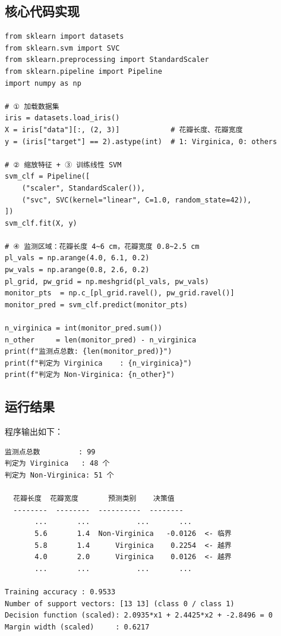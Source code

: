 \documentclass[10.5pt]{config}
\begin{document}
\subsection{核心代码实现}
\begin{listing}[H]
\begin{verbatim}
from sklearn import datasets
from sklearn.svm import SVC
from sklearn.preprocessing import StandardScaler
from sklearn.pipeline import Pipeline
import numpy as np

# ① 加载数据集
iris = datasets.load_iris()
X = iris["data"][:, (2, 3)]            # 花瓣长度、花瓣宽度
y = (iris["target"] == 2).astype(int)  # 1: Virginica, 0: others

# ② 缩放特征 + ③ 训练线性 SVM
svm_clf = Pipeline([
    ("scaler", StandardScaler()),
    ("svc", SVC(kernel="linear", C=1.0, random_state=42)),
])
svm_clf.fit(X, y)

# ④ 监测区域：花瓣长度 4~6 cm，花瓣宽度 0.8~2.5 cm
pl_vals = np.arange(4.0, 6.1, 0.2)
pw_vals = np.arange(0.8, 2.6, 0.2)
pl_grid, pw_grid = np.meshgrid(pl_vals, pw_vals)
monitor_pts  = np.c_[pl_grid.ravel(), pw_grid.ravel()]
monitor_pred = svm_clf.predict(monitor_pts)

n_virginica = int(monitor_pred.sum())
n_other     = len(monitor_pred) - n_virginica
print(f"监测点总数: {len(monitor_pred)}")
print(f"判定为 Virginica    : {n_virginica}")
print(f"判定为 Non-Virginica: {n_other}")
\end{verbatim}
\caption{SVM 线性分类核心代码（节选）}
\end{listing}

\subsection{运行结果}
程序输出如下：
\begin{lstlisting}[language={}, numbers=none, frame=single, backgroundcolor=\color{codebg}, basicstyle=\ttfamily\footnotesize, breaklines=true]
监测点总数         : 99
判定为 Virginica   : 48 个
判定为 Non-Virginica: 51 个

  花瓣长度  花瓣宽度       预测类别    决策值
  --------  --------  ----------  --------
       ...       ...           ...       ...
       5.6       1.4  Non-Virginica   -0.0126  <- 临界
       5.8       1.4      Virginica    0.2254  <- 越界
       4.0       2.0      Virginica    0.0126  <- 越界
       ...       ...           ...       ...

Training accuracy : 0.9533
Number of support vectors: [13 13] (class 0 / class 1)
Decision function (scaled): 2.0935*x1 + 2.4425*x2 + -2.8496 = 0
Margin width (scaled)     : 0.6217
\end{lstlisting}
\end{document}
